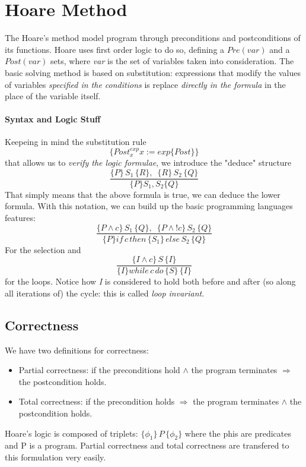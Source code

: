 \documentclass{article}
\begin{document}
		\section{Hoare Method}
			The Hoare's method model program through preconditions and postconditions of its functions. Hoare uses first order logic to do so, defining a $Pre(var)$ and a $Post(var)$ sets, where \emph{var} is the set of variables taken into consideration. The basic solving method is based on substitution: expressions that modify the values of variables \emph{specified in the conditions} is replace \emph{directly in the formula} in the place of the variable itself.
			
			\paragraph{Syntax and Logic Stuff}
				Keepeing in mind the substitution rule
				\begin{equation}
					\{Post_x^{exp} x := exp\{Post\}\}
				\end{equation}
				that allows us to \emph{verify the logic formulae}, we introduce the "deduce" structure
				\begin{equation}
					\frac{\{P\} \, S_1 \, \{R\}, \,\,\, \{R\} \, S_2 \, \{Q\}}{\{P\} S_1, S_2 \{Q\}}
				\end{equation}
				That simply means that the above formula is true, we can deduce the lower formula. With this notation, we can build up the basic programming languages features:
				\begin{equation}
					\frac{\{P \wedge c\} \, S_1 \, \{Q\}, \,\,\, \{P \wedge !c\} \, S_2 \, \{Q\}}{\{P\} if \, c \, then \,\{S_1\}\, else\, S_2 \,\{Q\}}
				\end{equation}
				For the selection and 
				\begin{equation}
					\frac{\{I \wedge c\} \, S \, \{I\}}{\{I\} while \, c \, do \,\{S\}\, \{I\}}
				\end{equation}
				for the loops. Notice how \emph{I} is considered to hold both before and after (so along all iterations of) the cycle: this is called \emph{loop invariant}. 
				
				
				
				
			\subsection{Correctness}
				We have two definitions for correctness:
				\begin{itemize}
					\item Partial correctness: if the preconditions hold $\wedge$ the program terminates $\Rightarrow$ the postcondition holds.
					\item Total correctness: if the precondition holds $\Rightarrow$ the program terminates $\wedge$ the postcondition holds. 
				\end{itemize}
				Hoare's logic is composed of triplets: $\{\phi_1\} \, P \, \{\phi_2\}$ where the phis are predicates and P is a program. Partial correctness and total correctness are transfered to this formulation very easily. 
				
\end{document}
